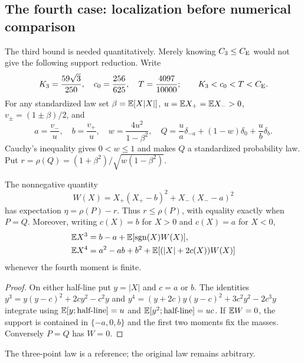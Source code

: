 \subsection{The fourth case: localization before numerical comparison}
\label{ext:n4-localization-section}

The third bound is needed quantitatively.  Merely knowing $C_3\le C_{\mathrm E}$
would not give the following support reduction.
Write
\[
 K_3=\frac{59\sqrt3}{250},\quad c_0=\frac{256}{625},\quad
 T=\frac{4097}{10000};\qquad K_3<c_0<T<C_{\mathrm E}.
\]
For any standardized law set
$\beta=\mathbb E[X|X|]$, $u=\mathbb E X_+=\mathbb E X_->0$,
$v_\pm=(1\pm\beta)/2$, and
\begin{equation}\label{ext:n4-reference}
 a=\frac{v_-}{u},\quad b=\frac{v_+}{u},\quad
 w=\frac{4u^2}{1-\beta^2},\quad
 Q=\frac ua\delta_{-a}+(1-w)\delta_0+\frac ub\delta_b.
\end{equation}
Cauchy's inequality gives $0<w\le1$ and makes $Q$ a standardized
probability law.  Put $r=\rho(Q)=(1+\beta^2)/\sqrt{w(1-\beta^2)}$.
\begin{lemma}\label{ext:n4-excess}
The nonnegative quantity
\[
 W(X)=X_+(X_+-b)^2+X_-(X_--a)^2
\]
has expectation $\eta=\rho(P)-r$.  Thus $r\le\rho(P)$, with
equality exactly when $P=Q$.  Moreover, writing $c(X)=b$ for $X>0$
and $c(X)=a$ for $X<0$,
\begin{align}
 \mathbb E X^3&=b-a+\mathbb E[\operatorname{sgn}(X)W(X)],\notag\\
 \mathbb E X^4&=a^2-ab+b^2+\mathbb E[(|X|+2c(X))W(X)]
 \label{ext:n4-physical-moments}
\end{align}
whenever the fourth moment is finite.
\end{lemma}
\begin{proof}
On either half-line put $y=|X|$ and $c=a$ or $b$.  The identities
$y^3=y(y-c)^2+2cy^2-c^2y$ and
$y^4=(y+2c)y(y-c)^2+3c^2y^2-2c^3y$ integrate using
$\mathbb E[y;\text{half-line}]=u$ and
$\mathbb E[y^2;\text{half-line}]=uc$.
If $\mathbb E W=0$, the support is contained in $\{-a,0,b\}$ and the
first two moments fix the masses.  Conversely $P=Q$ has $W=0$.
\end{proof}
The three-point law is a reference;
the original law remains arbitrary.

